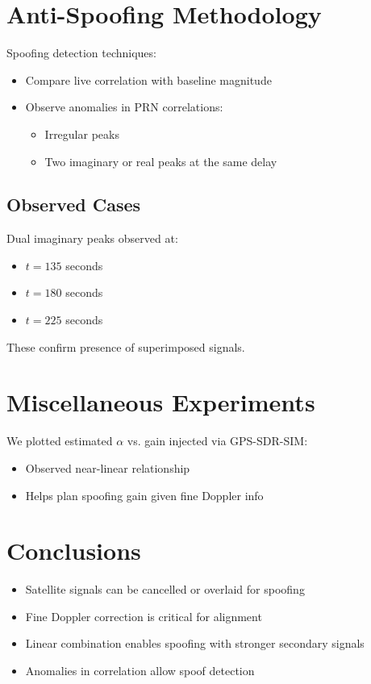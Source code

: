 \documentclass[12pt]{report}
\begin{document}
\begin{algorithm}
\section{Anti-Spoofing Methodology}
Spoofing detection techniques:
\begin{itemize}
  \item Compare live correlation with baseline magnitude
  \item Observe anomalies in PRN correlations:
    \begin{itemize}
      \item Irregular peaks
      \item Two imaginary or real peaks at the same delay
    \end{itemize}
\end{itemize}

\subsection*{Observed Cases}
Dual imaginary peaks observed at:
\begin{itemize}
  \item $t = 135$ seconds
  \item $t = 180$ seconds
  \item $t = 225$ seconds
\end{itemize}

These confirm presence of superimposed signals.

\section{Miscellaneous Experiments}
We plotted estimated $\alpha$ vs. gain injected via GPS-SDR-SIM:
\begin{itemize}
  \item Observed near-linear relationship
  \item Helps plan spoofing gain given fine Doppler info
\end{itemize}

\section{Conclusions}
\begin{itemize}
  \item Satellite signals can be cancelled or overlaid for spoofing
  \item Fine Doppler correction is critical for alignment
  \item Linear combination enables spoofing with stronger secondary signals
  \item Anomalies in correlation allow spoof detection
\end{itemize}


\end{algorithm}
\end{document}
